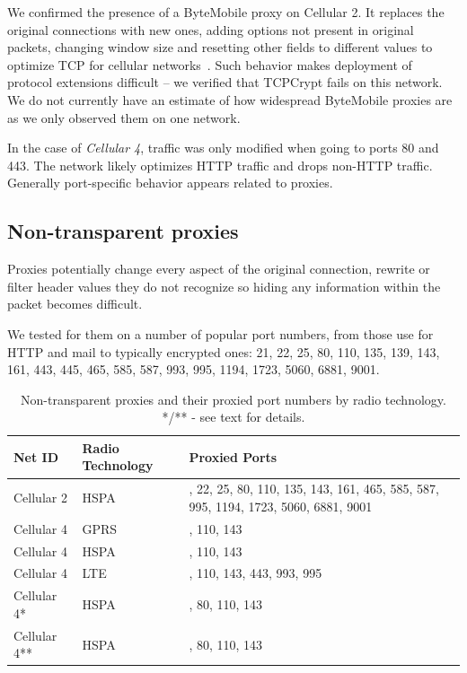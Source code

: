 \documentclass{sig-alternate-10pt}
\begin{document}
We confirmed the presence of a ByteMobile proxy on Cellular 2. It replaces the original connections with new ones, adding options not present in original packets, changing window size and resetting other fields to different values to optimize TCP for cellular networks~\cite{Ha:2006td}. Such behavior makes deployment of protocol extensions difficult -- we verified that TCPCrypt fails on this network. We do not currently have an estimate of how widespread ByteMobile proxies are as we only observed them on one network.

In the case of \emph{Cellular 4}, traffic was only modified when going to ports 80 and 443. The network likely optimizes HTTP traffic and drops non-HTTP traffic. Generally port-specific behavior appears related to proxies.

\subsection{Non-transparent proxies}
\label{sec:proxies}

Proxies potentially change every aspect of the original connection, rewrite or filter header values they do not recognize so hiding any information within the packet becomes difficult.

We tested for them on a number of popular port numbers, from those use for HTTP and mail to typically encrypted ones:
21, 22, 25, 80, 110, 135, 139, 143, 161, 443, 445, 465, 585, 587, 993, 995, 1194, 1723, 5060, 6881, 9001.

\begin{table}[t!]
{\small
\begin{center}
\begin{tabular}{| l | >{\centering\arraybackslash}m{1.8cm} | >{\centering\arraybackslash}m{3.7cm} |}
\hline
    \textbf{Net ID} & \textbf{Radio Technology} & \textbf{Proxied Ports} \\ \hline \hline
    Cellular 2      & HSPA                      & 21, 22, 25, 80, 110, 135, 143, 161, 465, 585, 587, 995, 1194, 1723, 5060, 6881, 9001 \\ \hline
    Cellular 4      & GPRS                      & 80, 110, 143 \\ \hline
    Cellular 4      & HSPA                      & 80, 110, 143 \\ \hline
    Cellular 4      & LTE                       & 80, 110, 143, 443, 993, 995 \\ \hline
    Cellular 4*     & HSPA                     & 25, 80, 110, 143 \\ \hline
    Cellular 4**    & HSPA                    & 25, 80, 110, 143 \\ \hline
\end{tabular}
\end{center}
}
\caption{Non-transparent proxies and their proxied port numbers by radio technology. */** - see text for details.}
\label{tab:proxies}
\end{table}
\end{document}
